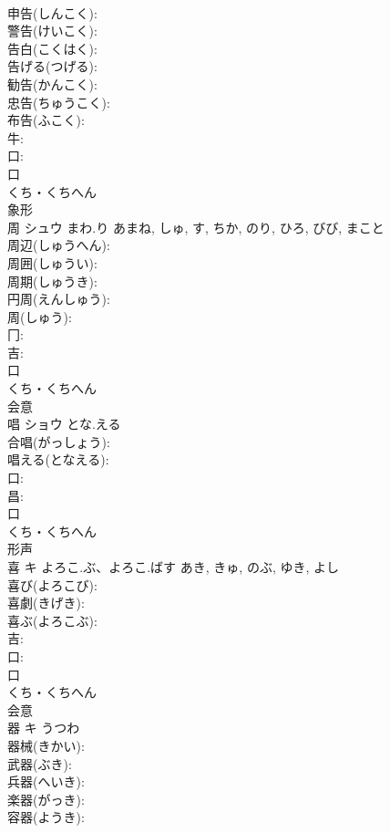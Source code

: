 \documentclass[8pt]{extreport}
\begin{document}
\begin{CJK}{UTF8}{min}
\\	申告(しんこく): 
\\	警告(けいこく): 
\\	告白(こくはく): 
\\	告げる(つげる): 
\\	勧告(かんこく): 
\\	忠告(ちゅうこく): 
\\	布告(ふこく): 
\\	牛: 
\\	口: 
\\	口	
\\	くち・くちへん	
\\	象形 
\\	周	シュウ	まわ.り	あまね, しゅ, す, ちか, のり, ひろ, びび, まこと	
\\	周辺(しゅうへん): 
\\	周囲(しゅうい): 
\\	周期(しゅうき): 
\\	円周(えんしゅう): 
\\	周(しゅう): 
\\	冂: 
\\	吉: 
\\	口	
\\	くち・くちへん	
\\	会意 
\\	唱	ショウ	とな.える		
\\	合唱(がっしょう): 
\\	唱える(となえる): 
\\	口: 
\\	昌: 
\\	口	
\\	くち・くちへん	
\\	形声 
\\	喜	キ	よろこ.ぶ、よろこ.ばす	あき, きゅ, のぶ, ゆき, よし	
\\	喜び(よろこび): 
\\	喜劇(きげき): 
\\	喜ぶ(よろこぶ): 
\\	吉: 
\\	口: 
\\	口	
\\	くち・くちへん	
\\	会意 
\\	器	キ	うつわ		
\\	器械(きかい): 
\\	武器(ぶき): 
\\	兵器(へいき): 
\\	楽器(がっき): 
\\	容器(ようき): 

\end{CJK}
\end{document}
